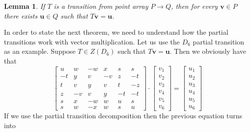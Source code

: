 \documentclass[a4paper,10pt]{article}
\theoremstyle{plain}
\newtheorem{Lemma}[Theorem]{Lemma}
\theoremstyle{definition}
\theoremstyle{remark}
\renewcommand{\vec}[1]{\mathbf{#1}}
\begin{document}
\begin{Lemma}
	If \( T \) is a transition from point array \( P \to Q \), then for every \( \vec{v} \in P \) there exists \( \vec{u} \in Q \) such that \( T\vec{v} = \vec{u} \).
\end{Lemma}
In order to state the next theorem, we need to understand how the partial transitions work with vector multiplication.
Let us use the \( D_6 \) partial transition as an example.
Suppose \( T \in Z(D_6) \) such that \( T\vec{v} = \vec{u} \).
Then we obviously have that 
\begin{equation*}
	\begin{bmatrix}
		u  & w  & -w & x  & s  & s  \\
		-t & y  & v  & -v & z  & -t \\
		t  & v  & y  & v  & t  & -z \\
		z  & -v & v  & y  & -t & -t \\
		s  & x  & -w & w  & u  & s  \\
		s  & w  & -x & w  & s  & u
	\end{bmatrix} 
	\cdot
	\begin{bmatrix}
		v_1 \\
		v_2 \\
		v_3 \\
		v_4 \\
		v_5 \\
		v_6
	\end{bmatrix}
	=
	\begin{bmatrix}
		u_1 \\
		u_2 \\
		u_3 \\
		u_4 \\
		u_5 \\
		u_6
	\end{bmatrix}
\end{equation*}
If we use the partial transition decomposition then the previous equation turns into
\end{document}

